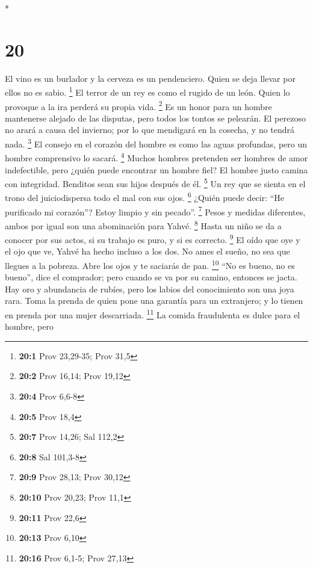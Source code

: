 \begin{paracol}{2}
\begin{otherlanguage}{english}
\end{otherlanguage}

\switchcolumn[0]*

\hypertarget{section-38}{%
\section{20}\label{section-38}}

 El vino es un burlador y la cerveza es un pendenciero.
Quien se deja llevar por ellos no es sabio. \footnote{\textbf{20:1} Prov
  23,29-35; Prov 31,5}  El terror de un rey es como el
rugido de un león. Quien lo provoque a la ira perderá su propia vida.
\footnote{\textbf{20:2} Prov 16,14; Prov 19,12}  Es un
honor para un hombre mantenerse alejado de las disputas, pero todos los
tontos se pelearán.  El perezoso no arará a causa del
invierno; por lo que mendigará en la cosecha, y no tendrá nada.
\footnote{\textbf{20:4} Prov 6,6-8}  El consejo en el
corazón del hombre es como las aguas profundas, pero un hombre
comprensivo lo sacará. \footnote{\textbf{20:5} Prov 18,4} 
Muchos hombres pretenden ser hombres de amor indefectible, pero ¿quién
puede encontrar un hombre fiel?  El hombre justo camina
con integridad. Benditos sean sus hijos después de él. \footnote{\textbf{20:7}
  Prov 14,26; Sal 112,2}  Un rey que se sienta en el trono
del juiciodispersa todo el mal con sus ojos. \footnote{\textbf{20:8} Sal
  101,3-8}  ¿Quién puede decir: ``He purificado mi
corazón''? Estoy limpio y sin pecado''. \footnote{\textbf{20:9} Prov
  28,13; Prov 30,12}  Pesos y medidas diferentes, ambos
por igual son una abominación para Yahvé. \footnote{\textbf{20:10} Prov
  20,23; Prov 11,1}  Hasta un niño se da a conocer por
sus actos, si su trabajo es puro, y si es correcto. \footnote{\textbf{20:11}
  Prov 22,6}  El oído que oye y el ojo que ve, Yahvé ha
hecho incluso a los dos.  No ames el sueño, no sea que
llegues a la pobreza. Abre los ojos y te saciarás de pan. \footnote{\textbf{20:13}
  Prov 6,10}  ``No es bueno, no es bueno'', dice el
comprador; pero cuando se va por su camino, entonces se jacta.
 Hay oro y abundancia de rubíes, pero los labios del
conocimiento son una joya rara.  Toma la prenda de quien
pone una garantía para un extranjero; y lo tienen en prenda por una
mujer descarriada. \footnote{\textbf{20:16} Prov 6,1-5; Prov 27,13}
 La comida fraudulenta es dulce para el hombre, pero

\end{paracol}
